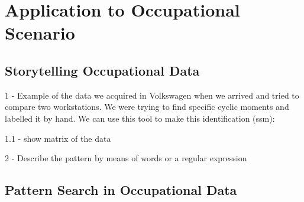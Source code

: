 \section{Application to Occupational Scenario}
\label{cha:application_occ}

\subsection{Storytelling Occupational Data}
\label{subsec:storytel}

1 - Example of the data we acquired in Volkswagen when we arrived and tried to compare two workstations. We were trying to find specific cyclic moments and labelled it by hand. We can use this tool to make this identification (ssm):

1.1 - show matrix of the data

2 - Describe the pattern by means of words or a regular expression


%

\subsection{Pattern Search in Occupational Data}
\label{subsec:search}


